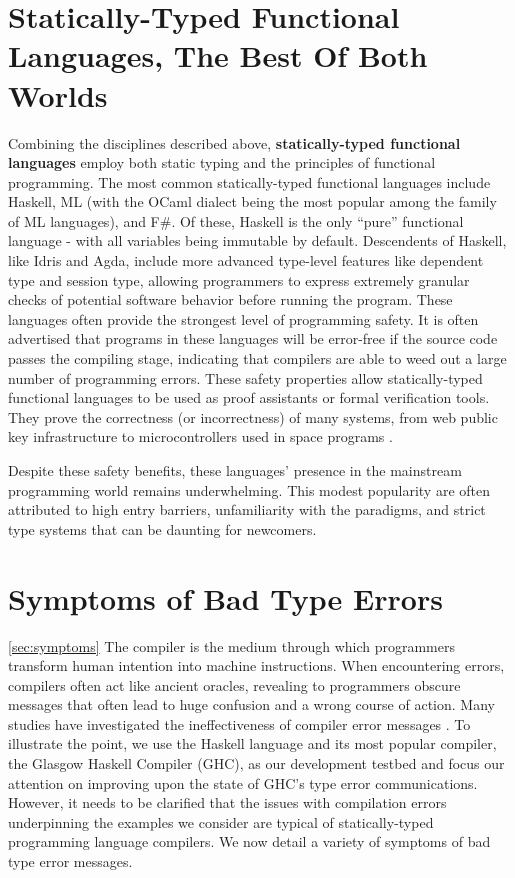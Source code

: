\section{Statically-Typed Functional Languages, The Best Of Both Worlds}
Combining the disciplines described above, \textbf{statically-typed functional languages} employ both static typing and the principles of functional programming. The most common statically-typed functional languages include Haskell,  ML (with the OCaml dialect being the most popular among the family of ML languages), and F\#. 
Of these, Haskell is the only ``pure'' functional language - with all variables being immutable by default.
Descendents of Haskell, like Idris and Agda, include more advanced type-level features like dependent type and session type, allowing programmers to express extremely granular checks of potential software behavior before running the program. These languages often provide the strongest level of programming safety. It is often advertised that programs in these languages will be error-free if the source code passes the compiling stage, indicating that compilers are able to weed out a large number of programming errors. These safety properties allow statically-typed functional languages to be used as proof assistants or formal verification tools. They prove the correctness (or incorrectness) of many systems, from web public key infrastructure \cite{Bhargavan2021-no} to microcontrollers used in space programs \cite{Mokhov2019-zj}. 

Despite these safety benefits, these languages' presence in the mainstream programming world remains underwhelming. This modest popularity are often attributed to high entry barriers, unfamiliarity with the paradigms, and strict type systems that can be daunting for newcomers.

\section{Symptoms of Bad Type Errors}

\ref{sec:symptoms}
 The compiler is the medium through which programmers transform human intention into machine instructions. When encountering errors, compilers often act like ancient oracles, revealing to programmers obscure messages that often lead to huge confusion and a wrong course of action. Many studies have investigated the ineffectiveness of compiler error messages \cite{Barik2017-gy, Becker2019-cs, Becker2016-kc}.  To illustrate the point, we use the Haskell language and its most popular compiler, the Glasgow Haskell Compiler (GHC), as our development testbed and focus our attention on improving upon the state of GHC's type error communications. However, it needs to be clarified that the issues with compilation errors underpinning the examples we consider are typical of statically-typed programming language compilers. We now detail a variety of symptoms of bad type error messages.



